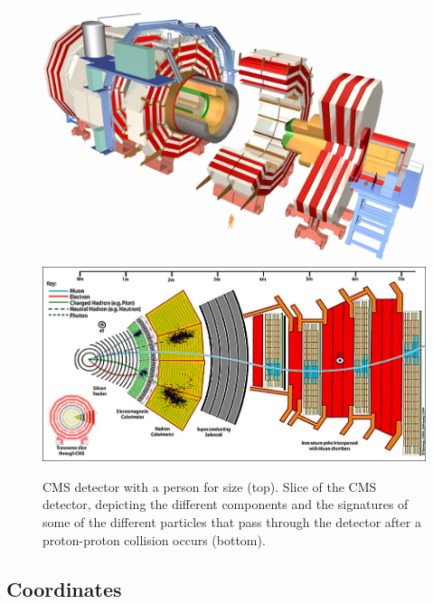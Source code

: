 \begin{figure}[h!]
    \centering
        \includegraphics[width=\textwidth]{F3/CMSnc}
        \includegraphics[width=\textwidth]{F3/cms_slice}
        \caption{CMS detector with a person for size (top). Slice of the CMS detector, depicting the different components and the signatures of some of the different particles that pass through the detector after a proton-proton collision occurs (bottom).}
        \label{Fig:CMS:Slice}
\end{figure}

\vspace{5mm}
\subsection{Coordinates}

